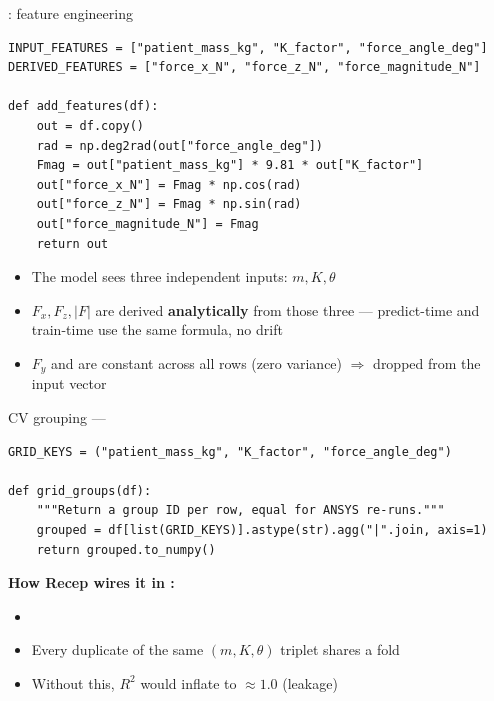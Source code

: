 \begin{frame}[fragile]{: feature engineering}
\begin{lstlisting}
INPUT_FEATURES = ["patient_mass_kg", "K_factor", "force_angle_deg"]
DERIVED_FEATURES = ["force_x_N", "force_z_N", "force_magnitude_N"]

def add_features(df):
    out = df.copy()
    rad = np.deg2rad(out["force_angle_deg"])
    Fmag = out["patient_mass_kg"] * 9.81 * out["K_factor"]
    out["force_x_N"] = Fmag * np.cos(rad)
    out["force_z_N"] = Fmag * np.sin(rad)
    out["force_magnitude_N"] = Fmag
    return out
\end{lstlisting}

  \vspace{0.2cm}
  \begin{itemize}\small
    \item The model sees three independent inputs: \(m, K, \theta\)
    \item \(F_x, F_z, |F|\) are derived \textbf{analytically} from those three
          --- predict-time and train-time use the same formula, no drift
    \item \(F_y\) and  are constant across all
          rows (zero variance) \(\Rightarrow\) dropped from the input vector
  \end{itemize}
\end{frame}

\begin{frame}[fragile]{CV grouping --- }
\begin{lstlisting}
GRID_KEYS = ("patient_mass_kg", "K_factor", "force_angle_deg")

def grid_groups(df):
    """Return a group ID per row, equal for ANSYS re-runs."""
    grouped = df[list(GRID_KEYS)].astype(str).agg("|".join, axis=1)
    return grouped.to_numpy()
\end{lstlisting}

  \vspace{0.4cm}
  \textbf{How Recep wires it in :}
  \begin{itemize}\small
    \item {}
    \item Every duplicate of the same \((m, K, \theta)\) triplet shares a fold
    \item Without this, \(R^2\) would inflate to \(\approx 1.0\) (leakage)
  \end{itemize}
\end{frame}

